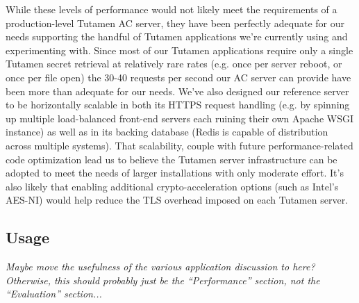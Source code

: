 While these levels of performance would not likely meet the
requirements of a production-level Tutamen AC server, they have been
perfectly adequate for our needs supporting the handful of Tutamen
applications we're currently using and experimenting with. Since most
of our Tutamen applications require only a single Tutamen secret
retrieval at relatively rare rates (e.g. once per server reboot, or
once per file open) the 30-40 requests per second our AC server can
provide have been more than adequate for our needs. We've also
designed our reference server to be horizontally scalable in both its
HTTPS request handling (e.g. by spinning up multiple load-balanced
front-end servers each ruining their own Apache WSGI instance) as well
as in its backing database (Redis is capable of distribution across
multiple systems). That scalability, couple with future
performance-related code optimization lead us to believe the Tutamen
server infrastructure can be adopted to meet the needs of larger
installations with only moderate effort. It's also likely that
enabling additional crypto-acceleration options (such as Intel's
AES-NI) would help reduce the TLS overhead imposed on each Tutamen
server.

\subsection{Usage}

{\em Maybe move the usefulness of the various application discussion to
here? Otherwise, this should probably just be the ``Performance''
section, not the ``Evaluation'' section...}

